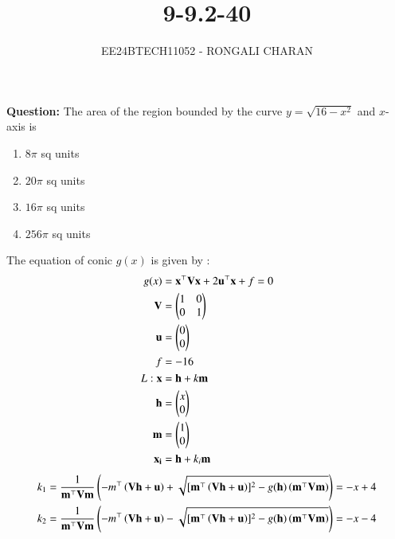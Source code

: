 \documentclass[journal,12pt,onecolumn]{IEEEtran}
\theoremstyle{remark}
\begin{document}

\vspace{3cm}
\title{9-9.2-40}
\author{EE24BTECH11052 - RONGALI CHARAN}
{\let\newpage\relax\maketitle}

\renewcommand{\thefigure}{\theenumi}
\renewcommand{\thetable}{\theenumi}
\setlength{\intextsep}{10pt} %


\renewcommand{\thetable}{\theenumi}
\textbf{Question:} The area of the region bounded by the curve $y=\sqrt{16-x^2}$ and $x$-axis is
\begin{enumerate}
\item $8\pi$ sq units
\item $20\pi$ sq units
\item $16\pi$ sq units
\item $256\pi$ sq units
\end{enumerate}
\solution
The equation of conic $g(x)$ is given by :
\begin{align}
	g(x) &= \mathbf{x}^\top \mathbf{V}\mathbf{x}+2\mathbf{u}^\top \mathbf{x}+f=0\\
	\mathbf{V} &= \begin{pmatrix}1 & 0\\0 & 1\end{pmatrix}\\
	\mathbf{u} &= \begin{pmatrix}0 \\ 0\end{pmatrix} \\
	f &= -16\\
	L: \mathbf{x} &= \mathbf{h}+k\mathbf{m} \\
	\mathbf{h} &= \begin{pmatrix}x \\ 0\end{pmatrix}\\
	\mathbf{m} &= \begin{pmatrix}1 \\ 0\end{pmatrix}\\
	\mathbf{x_i} &= \mathbf{h}+k_{i}\mathbf{m}
       \end{align}
\begin{align}
	k_1 &= \frac{1}{\mathbf{m}^\top \mathbf{V}\mathbf{m}}\left(-m^\top\left(\mathbf{V}\mathbf{h}+\mathbf{u}\right)+ \sqrt{[\mathbf{m}^\top \left(\mathbf{V}\mathbf{h}+\mathbf{u}\right)]^2 - g(\mathbf{h})\left(\mathbf{m}^\top\mathbf{V}\mathbf{m}\right)}\right) = -x+4 \\
	k_2 &= \frac{1}{\mathbf{m}^\top \mathbf{V}\mathbf{m}}\left(-m^\top\left(\mathbf{V}\mathbf{h}+\mathbf{u}\right)- \sqrt{[\mathbf{m}^\top \left(\mathbf{V}\mathbf{h}+\mathbf{u}\right)]^2 - g(\mathbf{h})\left(\mathbf{m}^\top\mathbf{V}\mathbf{m}\right)}\right) = -x-4
\end{align}
\end{document}
